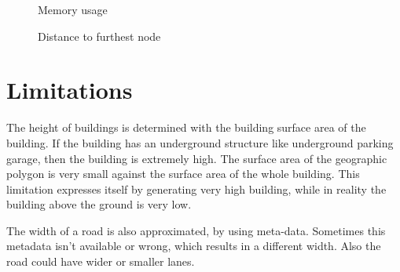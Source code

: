 \begin{figure}[htb!]
\centering
{}
\caption{Memory usage}
\label{graph:MemoryUsage}
\end{figure}

\begin{figure}[htb!]
\centering
{}
\caption{Distance to furthest node}
\label{graph:DistanceGraph}
\end{figure}

\section{Limitations}
\label{sec:Limitations}
The height of buildings is determined with the building surface area of the building. If the building has an underground structure like underground parking garage, then the building is extremely high. The surface area of the geographic polygon is very small against the surface area of the whole building. This limitation expresses itself by generating very high building, while in reality the building above the ground is very low.

The width of a road is also approximated, by using meta-data. Sometimes this metadata isn’t available or wrong, which results in a different width. Also the road could have wider or smaller lanes.

